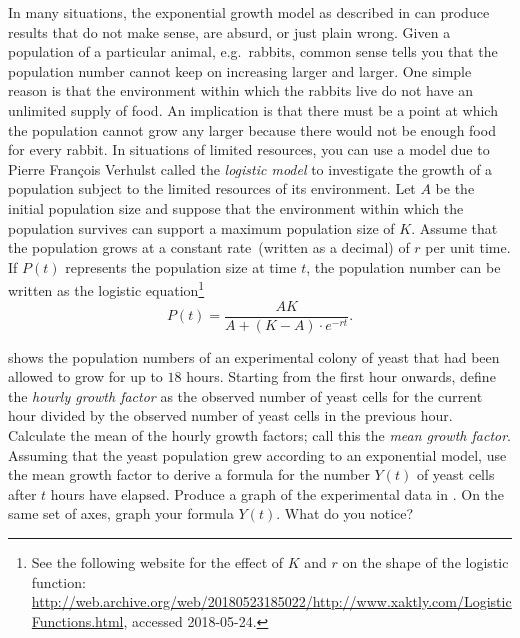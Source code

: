 \documentclass[a4paper,oneside,12pt]{article}
\begin{document}
\begin{problem}
\begin{table}[!htbp]
\centering

\caption{%
  The observed population size in an experimental colony of yeast.
  The data are due to T.~Carlson, published in~1913.  The column for
  hours lists the numbers of hours that the population had been
  allowed to grow.  The column for observed numbers lists the counts
  of the number of yeast cells that were found in the colony after a
  given number of hours.
}
\label{tab:yeast}
\end{table}

\item In many situations, the exponential growth model as described
  in  can produce results that do not
  make sense, are absurd, or just plain wrong.  Given a population of
  a particular animal, e.g.~rabbits, common sense tells you that the
  population number cannot keep on increasing larger and larger.  One
  simple reason is that the environment within which the rabbits live
  do not have an unlimited supply of food.  An implication is that
  there must be a point at which the population cannot grow any larger
  because there would not be enough food for every rabbit.  In
  situations of limited resources, you can use a model due to Pierre
  Fran\c{c}ois Verhulst called the \emph{logistic model} to
  investigate the growth of a population subject to the limited
  resources of its environment.  Let $A$ be the initial population
  size and suppose that the environment within which the population
  survives can support a maximum population size of $K$.  Assume that
  the population grows at a constant rate~(written as a decimal) of
  $r$ per unit time.  If $P(t)$ represents the population size at time
  $t$, the population number can be written as the logistic
  equation\footnote{
    See the following website for the effect of $K$ and $r$ on the
    shape of the logistic function:
    \url{http://web.archive.org/web/20180523185022/http://www.xaktly.com/LogisticFunctions.html},
    accessed 2018-05-24.
  }
  \begin{equation}
  \label{eqn:logistic_equation}
  P(t)
  =
  \frac{
    AK
  }{
    A + (K - A) \cdot e^{-rt}
  }.
  \end{equation}
  \begin{packedenum}
  \item\label{subprob:yeast_data_mean_growth_factor}
     shows the population numbers of an experimental
    colony of yeast that had been allowed to grow for up to $18$
    hours.  Starting from the first hour onwards, define the
    \emph{hourly growth factor} as the observed number of yeast cells
    for the current hour divided by the observed number of yeast cells
    in the previous hour.  Calculate the mean of the hourly growth
    factors; call this the \emph{mean growth factor}.  Assuming that
    the yeast population grew according to an exponential model, use
    the mean growth factor to derive a formula for the number $Y(t)$
    of yeast cells after $t$ hours have elapsed.  Produce a graph of
    the experimental data in .  On the same set of
    axes, graph your formula $Y(t)$.  What do you notice?


\end{packedenum}
\end{problem}
\end{document}
